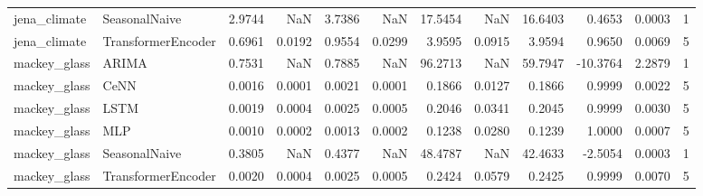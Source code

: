 \begin{tabular}{llrrrrrrrrrr}
jena_climate & SeasonalNaive & 2.9744 & NaN & 3.7386 & NaN & 17.5454 & NaN & 16.6403 & 0.4653 & 0.0003 & 1 \\
jena_climate & TransformerEncoder & 0.6961 & 0.0192 & 0.9554 & 0.0299 & 3.9595 & 0.0915 & 3.9594 & 0.9650 & 0.0069 & 5 \\
mackey_glass & ARIMA & 0.7531 & NaN & 0.7885 & NaN & 96.2713 & NaN & 59.7947 & -10.3764 & 2.2879 & 1 \\
mackey_glass & CeNN & 0.0016 & 0.0001 & 0.0021 & 0.0001 & 0.1866 & 0.0127 & 0.1866 & 0.9999 & 0.0022 & 5 \\
mackey_glass & LSTM & 0.0019 & 0.0004 & 0.0025 & 0.0005 & 0.2046 & 0.0341 & 0.2045 & 0.9999 & 0.0030 & 5 \\
mackey_glass & MLP & 0.0010 & 0.0002 & 0.0013 & 0.0002 & 0.1238 & 0.0280 & 0.1239 & 1.0000 & 0.0007 & 5 \\
mackey_glass & SeasonalNaive & 0.3805 & NaN & 0.4377 & NaN & 48.4787 & NaN & 42.4633 & -2.5054 & 0.0003 & 1 \\
mackey_glass & TransformerEncoder & 0.0020 & 0.0004 & 0.0025 & 0.0005 & 0.2424 & 0.0579 & 0.2425 & 0.9999 & 0.0070 & 5 \\
\bottomrule
\end{tabular}
